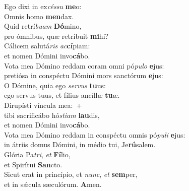 \evenverse Ego dixi in ex\textit{cés}\textit{su} \textbf{me}o:~\*\\
\evenverse Omnis homo \textbf{men}dax.\\
\oddverse Quid retrí\textit{bu}\textit{am} \textbf{Dó}mino,~\*\\
\oddverse pro ómnibus, quæ retríbuit \textbf{mi}hi?\\
\evenverse Cálicem salutá\textit{ris} \textit{ac}\textbf{cí}piam:~\*\\
\evenverse et nomen Dómini invo\textbf{cá}bo.\\
\oddverse Vota mea Dómino reddam coram omni pó\textit{pu}\textit{lo} \textbf{e}jus:~\*\\
\oddverse pretiósa in conspéctu Dómini mors sanctórum \textbf{e}jus:\\
\evenverse O Dómine, quia ego \textit{ser}\textit{vus} \textbf{tu}us:~\*\\
\evenverse ego servus tuus, et fílius ancíllæ \textbf{tu}æ.\\
\oddverse Dirupísti víncula mea:~+\\
\oddverse  tibi sacrificábo hó\textit{sti}\textit{am} \textbf{lau}dis,~\*\\
\oddverse et nomen Dómini invo\textbf{cá}bo.\\
\evenverse Vota mea Dómino reddam in conspéctu omnis pó\textit{pu}\textit{li} \textbf{e}jus:~\*\\
\evenverse in átriis domus Dómini, in médio tui, Je\textbf{rú}salem.\\
\oddverse Glória Pa\textit{tri}, \textit{et} \textbf{Fí}lio,~\*\\
\oddverse et Spirítui \textbf{San}cto.\\
\evenverse Sicut erat in princípio, et \textit{nunc}, \textit{et} \textbf{sem}per,~\*\\
\evenverse et in sǽcula sæculórum. \textbf{A}men.\\
